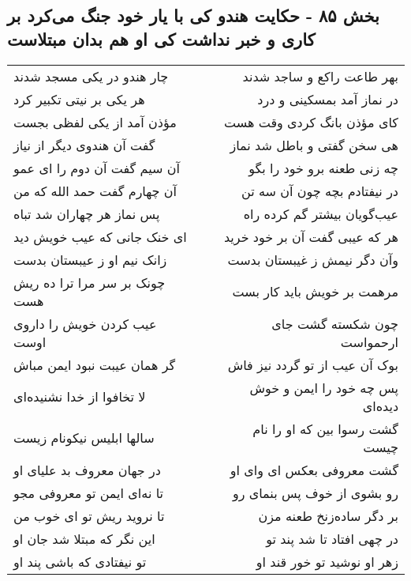 \begin{center}
\section*{بخش ۸۵ - حکایت هندو کی با یار خود جنگ می‌کرد بر کاری و خبر نداشت کی او هم بدان مبتلاست}
\label{sec:sh085}
\begin{longtable}{l p{0.5cm} r}
چار هندو در یکی مسجد شدند
&&
بهر طاعت راکع و ساجد شدند
\\
هر یکی بر نیتی تکبیر کرد
&&
در نماز آمد بمسکینی و درد
\\
مؤذن آمد از یکی لفظی بجست
&&
کای مؤذن بانگ کردی وقت هست
\\
گفت آن هندوی دیگر از نیاز
&&
هی سخن گفتی و باطل شد نماز
\\
آن سیم گفت آن دوم را ای عمو
&&
چه زنی طعنه برو خود را بگو
\\
آن چهارم گفت حمد الله که من
&&
در نیفتادم بچه چون آن سه تن
\\
پس نماز هر چهاران شد تباه
&&
عیب‌گویان بیشتر گم کرده راه
\\
ای خنک جانی که عیب خویش دید
&&
هر که عیبی گفت آن بر خود خرید
\\
زانک نیم او ز عیبستان بدست
&&
وآن دگر نیمش ز غیبستان بدست
\\
چونک بر سر مرا ترا ده ریش هست
&&
مرهمت بر خویش باید کار بست
\\
عیب کردن خویش را داروی اوست
&&
چون شکسته گشت جای ارحمواست
\\
گر همان عیبت نبود ایمن مباش
&&
بوک آن عیب از تو گردد نیز فاش
\\
لا تخافوا از خدا نشنیده‌ای
&&
پس چه خود را ایمن و خوش دیده‌ای
\\
سالها ابلیس نیکونام زیست
&&
گشت رسوا بین که او را نام چیست
\\
در جهان معروف بد علیای او
&&
گشت معروفی بعکس ای وای او
\\
تا نه‌ای ایمن تو معروفی مجو
&&
رو بشوی از خوف پس بنمای رو
\\
تا نروید ریش تو ای خوب من
&&
بر دگر ساده‌زنخ طعنه مزن
\\
این نگر که مبتلا شد جان او
&&
در چهی افتاد تا شد پند تو
\\
تو نیفتادی که باشی پند او
&&
زهر او نوشید تو خور قند او
\\
\end{longtable}
\end{center}
